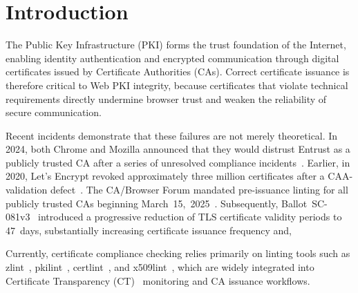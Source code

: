 \section{Introduction}
\label{sec:intro}

The Public Key Infrastructure (PKI) forms the trust foundation of the Internet, enabling identity authentication and encrypted communication through digital certificates issued by Certificate Authorities (CAs).
Correct certificate issuance is therefore critical to Web PKI integrity, because certificates that violate technical requirements directly undermine browser trust and weaken the reliability of secure communication.

Recent incidents demonstrate that these failures are not merely theoretical.
In 2024, both Chrome and Mozilla announced that they would distrust Entrust as a publicly trusted CA after a series of unresolved compliance incidents~\cite{mozilla2024entrust,chrome2024entrust}.
Earlier, in 2020, Let's Encrypt revoked approximately three million certificates after a CAA-validation defect~\cite{letsencrypt2020caa}.
The CA/Browser Forum mandated pre-issuance linting for all publicly trusted CAs beginning March~15,~2025~\cite{cabf-sc75-2024}.
Subsequently, Ballot~SC-081v3~\cite{cabf-sc081v3} introduced a progressive reduction of TLS certificate validity periods to 47~days, substantially increasing certificate issuance frequency and, 

Currently, certificate compliance checking relies primarily on linting tools such as zlint~\cite{kumar2018tracking}, pkilint~\cite{pkilint}, certlint~\cite{certlint}, and x509lint~\cite{x509lint}, which are widely integrated into Certificate Transparency (CT)~\cite{stark2019does} monitoring and CA issuance workflows.


